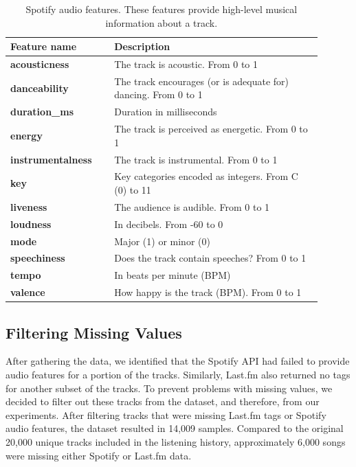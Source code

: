 \documentclass[sn-mathphys]{sn-jnl}%
\theoremstyle{thmstyleone}%
\theoremstyle{thmstyletwo}%
\theoremstyle{thmstylethree}%
\begin{document}
\begin{table}[h!]
      \centering
      \caption{Spotify audio features. These features provide high-level musical information about a track.} \label{table:spotify-features}
      \begin{tabular}{p{0.3\linewidth}p{0.6\linewidth}}
          \toprule
          \bfseries \textbf{Feature name} & \textbf{Description} \\
          \midrule
          \textbf{acousticness} & The track is acoustic. From 0 to 1 \\
          \textbf{danceability} & The track encourages (or is adequate for) dancing. From 0 to 1 \\
          \textbf{duration\_ms}  &  Duration in milliseconds \\
          \textbf{energy}  &  The track is perceived as energetic. From 0 to 1\\
          \textbf{instrumentalness}  &  The track is instrumental. From 0 to 1 \\
          \textbf{key}  &  Key categories encoded as integers. From C (0) to 11 \\
          \textbf{liveness}  &  The audience is audible. From 0 to 1\\
          \textbf{loudness}  &  In decibels. From -60 to 0 \\
          \textbf{mode}  & Major (1) or minor (0) \\
          \textbf{speechiness}  & Does the track contain speeches? From 0 to 1 \\
          \textbf{tempo}  & In beats per minute (BPM) \\
          \textbf{valence} & How happy is the track (BPM). From 0 to 1 \\
          \bottomrule
      \end{tabular}
  \end{table}


\subsection{Filtering Missing Values}

After gathering the data, we identified that the Spotify API had failed to provide audio features for a portion of the tracks.
Similarly, Last.fm also returned no tags for another subset of the tracks.
To prevent problems with missing values, we decided to filter out these tracks from the dataset, and therefore, from our experiments.
After filtering tracks that were missing Last.fm tags or Spotify audio features,
the dataset resulted in 14,009 samples.
Compared to the original 20,000 unique tracks included in the listening history, approximately 6,000 songs were missing either Spotify or Last.fm data.
\end{document}
